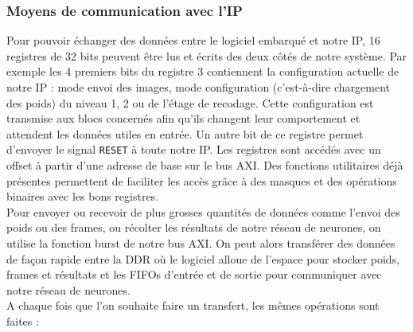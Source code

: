 \subsubsection{Moyens de communication avec l'IP}
Pour pouvoir échanger des données entre le logiciel embarqué et notre IP, 16
registres de 32 bits peuvent être lus et écrits des deux côtés de notre
système. Par exemple
les 4 premiers bits du registre 3 contiennent la configuration actuelle de notre
IP : mode envoi des images, mode configuration (c'est-à-dire chargement des poids) du
niveau 1, 2 ou de l'étage de recodage. Cette configuration est transmise
aux blocs concernés afin qu'ils changent leur comportement et attendent les
données utiles en entrée. Un autre bit de ce registre permet d'envoyer le
signal \texttt{RESET} à toute notre IP.
Les registres sont accédés avec un offset à partir d'une adresse de base
sur le bus AXI. Des fonctions utilitaires déjà présentes
permettent de faciliter les accès grâce à des masques et des opérations
binaires avec les bons registres. \\
Pour envoyer ou recevoir de plus grosses quantités de données comme l'envoi
des poids ou des frames, ou récolter les résultats de notre réseau de neurones,
on utilise la fonction burst de notre bus AXI. On peut alors transférer des
données de façon rapide entre la DDR où le logiciel alloue de l'espace
pour stocker poids, frames et résultats et les FIFOs d'entrée et de sortie pour
communiquer avec notre réseau de neurones. \\
A chaque fois que l'on souhaite faire un transfert, les mêmes opérations sont
faites :
